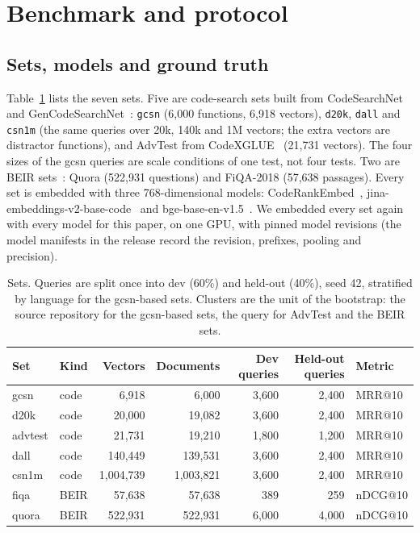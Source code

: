 \section{Benchmark and protocol}\label{sec:protocol}

\subsection{Sets, models and ground truth}

Table~\ref{tab:sets} lists the seven sets.
Five are code-search sets built from CodeSearchNet~\cite{husain2019codesearchnet} and
GenCodeSearchNet~\cite{diera2023gencodesearchnet}: \texttt{gcsn} (6,000 functions, 6,918 vectors),
\texttt{d20k}, \texttt{dall} and \texttt{csn1m} (the same queries over 20k, 140k and 1M vectors; the
extra vectors are distractor functions), and AdvTest from CodeXGLUE~\cite{lu2021codexglue} (21,731
vectors). The four sizes of the gcsn queries are scale conditions of one test, not four tests.
Two are BEIR sets~\cite{thakur2021beir}: Quora (522,931 questions) and FiQA-2018 (57,638 passages).
Every set is embedded with three 768-dimensional models: CodeRankEmbed~\cite{suresh2025cornstack},
jina-embeddings-v2-base-code~\cite{gunther2023jina2} and bge-base-en-v1.5~\cite{xiao2024cpack}.
We embedded every set again with every model for this paper, on one GPU, with pinned model revisions
(the model manifests in the release record the revision, prefixes, pooling and precision).

\begin{table}[t]\centering\small
\caption{Sets. Queries are split once into dev (60\%) and held-out (40\%), seed 42, stratified by
language for the gcsn-based sets. Clusters are the unit of the bootstrap: the source repository for the
gcsn-based sets, the query for AdvTest and the BEIR sets.}\label{tab:sets}
\begin{tabular}{llrrrrl}\toprule
Set & Kind & Vectors & Documents & Dev queries & Held-out queries & Metric\\\midrule
gcsn & code & 6,918 & 6,000 & 3,600 & 2,400 & MRR@10\\
d20k & code & 20,000 & 19,082 & 3,600 & 2,400 & MRR@10\\
advtest & code & 21,731 & 19,210 & 1,800 & 1,200 & MRR@10\\
dall & code & 140,449 & 139,531 & 3,600 & 2,400 & MRR@10\\
csn1m & code & 1,004,739 & 1,003,821 & 3,600 & 2,400 & MRR@10\\
fiqa & BEIR & 57,638 & 57,638 & 389 & 259 & nDCG@10\\
quora & BEIR & 522,931 & 522,931 & 6,000 & 4,000 & nDCG@10\\\bottomrule
\end{tabular}
\end{table}

